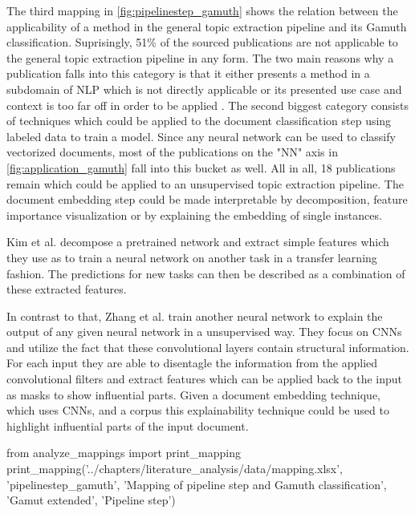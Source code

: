 The third mapping in \autoref{fig:pipelinestep_gamuth} shows the relation between the applicability of a method in the general topic extraction pipeline and its Gamuth classification. Suprisingly, 51\% of the sourced publications are not applicable to the general topic extraction pipeline in any form. The two main reasons why a publication falls into this category is that it either presents a method in a subdomain of NLP which is not directly applicable \cite{goyalTransparentAISystems2016} \cite{itoTextVisualizingNeuralNetwork2018a} or its presented use case and context is too far off in order to be applied \cite{8591457} \cite{gengHumancentricTransferLearning}. 
The second biggest category consists of techniques which could be applied to the document classification step using labeled data to train a model. Since any neural network can be used to classify vectorized documents, most of the publications on the "NN" axis in \autoref{fig:application_gamuth} fall into this bucket as well. All in all, 18 publications remain which could be applied to an unsupervised topic extraction pipeline. 
The document embedding step could be made interpretable by decomposition, feature importance visualization or by explaining the embedding of single instances. 

Kim et al. \cite{kimStructureDeepNeural2019} decompose a pretrained network and extract simple features which they use as to train a neural network on another task in a transfer learning fashion. The predictions for new tasks can then be described as a combination of these extracted features.

In contrast to that, Zhang et al. \cite{zhangUnsupervisedLearningNeural2018} train another neural network to explain the output of any given neural network in a unsupervised way. They focus on CNNs and utilize the fact that these convolutional layers contain structural information. For each input they are able to disentagle the information from the applied convolutional filters and extract features which can be applied back to the input as masks to show influential parts. Given a document embedding technique, which uses CNNs, and a corpus this explainability technique could be used to highlight influential parts of the input document.

\begin{pycode}
from analyze_mappings import print_mapping
print_mapping('../chapters/literature_analysis/data/mapping.xlsx', 'pipelinestep_gamuth', 'Mapping of pipeline step and Gamuth classification', 'Gamut extended', 'Pipeline step')
\end{pycode}

